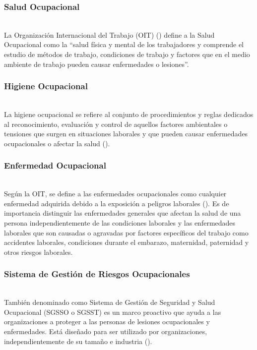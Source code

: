 \subsubsection{Salud Ocupacional}\hfill\\
\indent
La Organización Internacional del Trabajo (OIT) (\citeyear{ilo_thesaurus_salud_ocupacional}) define a la Salud Ocupacional como la ``salud física y mental de los trabajadores y comprende el estudio de métodos de trabajo, condiciones de trabajo y factores que en el medio ambiente de trabajo pueden causar enfermedades o lesiones''.

\subsubsection{Higiene Ocupacional}\hfill\\
\indent
La higiene ocupacional se refiere al conjunto de procedimientos y reglas dedicados al reconocimiento, evaluación y control de aquellos factores ambientales o tensiones que surgen en situaciones laborales y que pueden causar enfermedades ocupacionales o afectar la salud (\cite{brauer2022safety}). 

\subsubsection{Enfermedad Ocupacional}\hfill\\
\indent
Según la OIT, se define a las enfermedades ocupacionales como cualquier enfermedad adquirida debido a la exposición a peligros laborales (\cite{valverde2022enfermedad}). Es de importancia distinguir las enfermedades generales que afectan la salud de una persona independientemente de las condiciones laborales y las enfermedades laborales que son causadas o agravadas por factores específicos del trabajo como accidentes laborales, condiciones durante el embarazo, maternidad, paternidad y otros riesgos laborales.

\subsubsection{Sistema de Gestión de Riesgos Ocupacionales}\hfill\\
\indent
También denominado como Sistema de Gestión de Seguridad y Salud Ocupacional (SGSSO o SGSST) es un marco proactivo que ayuda a las organizaciones a proteger a las personas de lesiones ocupacionales y enfermedades. Está diseñado para ser utilizado por organizaciones, independientemente de su tamaño e industria (\cite{soltanifar2022iso}).

